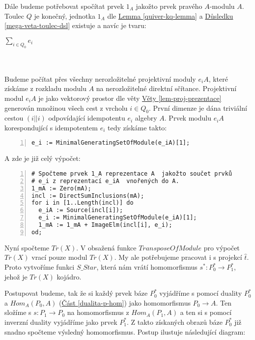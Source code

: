       Dále budeme potřebovat spočítat prvek $1_A$ jakožto prvek  pravého $A$-modulu 
      $A$.   Toulec $Q$ je konečný, jednotka $1_A$ dle 
   \hyperref[quiver-kq-lemma]{Lemma \ref*{quiver-kq-lemma}} 
   a \hyperref[mega-veta-toulec-dsl]{Důsledku \ref*{mega-veta-toulec-dsl}} existuje a 
   navíc je tvaru: \\
   \centerline{$\sum_{i\in Q_0}e_i$}\\\\
      Budeme počítat přes všechny nerozložitelné 
      projektivní moduly $e_iA$, které získáme z rozkladu modulu $A$ na nerozložitelné direktní sčítance.     
      Projektivní modul $e_iA$ je jako vektorový prostor
      dle věty \hyperref[lem-proj-prezentace]{Věty \ref*{lem-proj-prezentace}}
      generován množinou všech cest z vrcholu $i\in Q_0$. První dimenze je dána 
      triviální cestou $(i||i)$ odpovídající idempotentu $e_i$ algebry $A$. 
      Prvek modulu $e_iA$ korespondující s idempotentem $e_i$ tedy získáme 
      takto:
      \begin{Verbatim}[frame=single,numbers=left]
e_i := MinimalGeneratingSetOfModule(e_iA)[1];         
      \end{Verbatim}            
      A zde je již celý výpočet:
    
      \begin{Verbatim}[frame=single,numbers=left]
# Spočteme prvek 1_A reprezentace A  jakožto součet prvků
# e_i z reprezentací e_iA  vnořených do A.
1_mA := Zero(mA);
incl := DirectSumInclusions(mA);
for i in [1..Length(incl)] do
  e_iA := Source(incl[i]);
  e_i := MinimalGeneratingSetOfModule(e_iA)[1];
  1_mA := 1_mA + ImageElm(incl[i], e_i);
od;
      \end{Verbatim}

      
      Nyní spočteme $Tr(X)$. V \cite{QPA} obsažená funkce $TransposeOfModule$ pro výpočet $Tr(X)$ vrací pouze modul $Tr(X)$.
      My ale potřebujeme pracovat i s projekcí $\hat t$. 
      Proto vytvoříme funkci  $S\_Star$, která nám vrátí homomorfismus $s^*:P_0^*\to 
      P_1^*$, jehož je $Tr(X)$ kojádro.
      
      Postupovat budeme, tak že si každý prvek báze $P_0^*$ vyjádříme s pomocí 
      duality $P_0^*$ a $Hom_A(P_0,A)$ (\hyperref[dualita-p-hom]{Část \ref*{dualita-p-hom}}) 
      jako homomorfismus $P_0\to A$. Ten složíme s $s:P_1\to P_0$ na homomorfismus z 
      $Hom_A(P_1,A)$ a ten si s pomocí inverzní duality vyjádříme jako prvek 
      $P_1^*$. Z takto získaných obrazů báze $P_0^*$ již snadno spočteme výsledný 
      homomorfismus. Postup ilustuje následující diagram:
      \\\\\centerline{}\\\\
      
